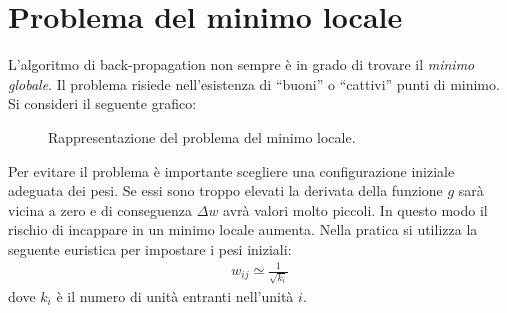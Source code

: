 
	\newpage

	\section{Problema del minimo locale} %
	\label{sec:problema_del_minimo_locale}
	L'algoritmo di back-propagation non sempre è in grado di trovare il \emph{minimo globale}. Il problema risiede nell'esistenza di “buoni” o “cattivi” punti di minimo. Si consideri il seguente grafico:

	\begin{figure}[h!]
		\centering
		\caption{Rappresentazione del problema del minimo locale.}
	\end{figure}

	Per evitare il problema è importante scegliere una configurazione iniziale adeguata dei pesi. Se essi sono troppo elevati la derivata della funzione $g$ sarà vicina a zero e di conseguenza $\Delta w$ avrà valori molto piccoli. In questo modo il rischio di incappare in un minimo locale aumenta. Nella pratica si utilizza la seguente euristica per impostare i pesi iniziali:
	\begin{align*}
		w_{ij} \simeq \frac{1}{\sqrt{k_i}}
	\end{align*}
	dove $k_i$ è il numero di unità entranti nell'unità $i$.\\


